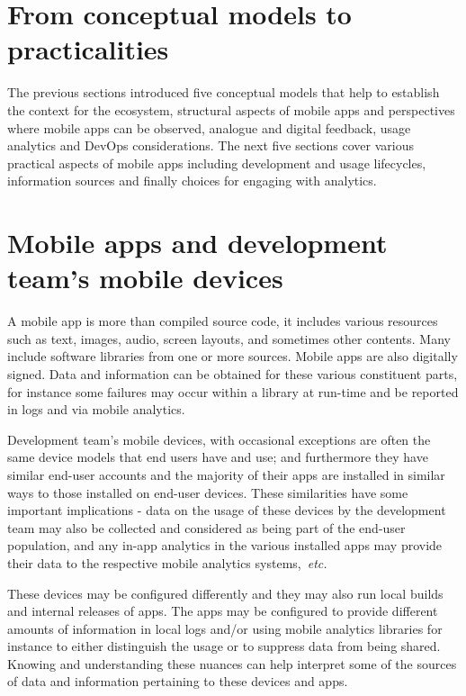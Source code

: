 \section{From conceptual models to practicalities}
The previous sections introduced five conceptual models that help to establish the context for the ecosystem, structural aspects of mobile apps and perspectives where mobile apps can be observed, analogue and digital feedback, usage analytics and DevOps considerations. The next five sections cover various practical aspects of mobile apps including development and usage lifecycles, information sources and finally choices for engaging with analytics.

\section{Mobile apps and development team's mobile devices}
A mobile app is more than compiled source code, it includes various resources such as text, images, audio, screen layouts, and sometimes other contents. Many include software libraries from one or more sources. Mobile apps are also digitally signed. Data and information can be obtained for these various constituent parts, for instance some failures may occur within a library at run-time and be reported in logs and via mobile analytics.

Development team's mobile devices, with occasional exceptions are often the same device models that end users have and use; and furthermore they have similar end-user accounts and the majority of their apps are installed in similar ways to those installed on end-user devices. These similarities have some important implications - data on the usage of these devices by the development team may also be collected and considered as being part of the end-user population, and any in-app analytics in the various installed apps may provide their data to the respective mobile analytics systems,~\emph{etc.}

These devices may be configured differently and they may also run local builds and internal releases of apps. The apps may be configured to provide different amounts of information in local logs and/or using mobile analytics libraries for instance to either distinguish the usage or to suppress data from being shared. Knowing and understanding these nuances can help interpret some of the sources of data and information pertaining to these devices and apps.

